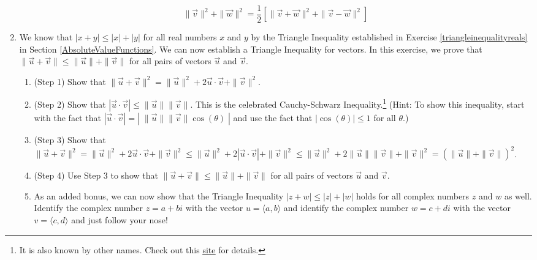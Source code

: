 \begin{enumerate}
\[ \|\vec{v}\|^2 + \|\vec{w}\|^2 = \dfrac{1}{2}\left[ \| \vec{v} + \vec{w}\|^2 + \|\vec{v} - \vec{w}\|^2\right] \]

\item We know that $|x + y| \leq |x| + |y|$ for all real numbers $x$ and $y$ by the Triangle Inequality established in Exercise \ref{triangleinequalityreals} in Section \ref{AbsoluteValueFunctions}.  We can now establish a Triangle Inequality for vectors.  In this exercise, we prove that $\| \vec{u} + \vec{v} \| \leq \| \vec{u} \| + \| \vec{v} \|$ for all pairs of vectors $\vec{u}$ and $\vec{v}$. 

\begin{enumerate}

\item (Step 1) Show that $\| \vec{u} + \vec{v} \|^{2} = \| \vec{u} \|^{2} + 2\vec{u} \cdot \vec{v} + \| \vec{v} \|^{2}$.

\item (Step 2) Show that $|\vec{u} \cdot \vec{v}| \leq \| \vec{u} \| \| \vec{v} \|$.  This is the celebrated Cauchy-Schwarz Inequality.\footnote{It is also known by other names.  Check out this \href{http://en.wikipedia.org/wiki/Cauchy-Schwarz_inequality}{\underline{site}} for details.}  (Hint: To show this inequality, start with the fact that $|\vec{u} \cdot \vec{v}| = |\; \| \vec{u} \| \| \vec{v} \|\cos(\theta) \;|$ and use the fact that $|\cos(\theta)| \leq 1$ for all $\theta$.)

\item (Step 3) Show that $\| \vec{u} + \vec{v} \|^{2} = \| \vec{u} \|^{2} + 2\vec{u} \cdot \vec{v} + \| \vec{v} \|^{2} \leq \| \vec{u} \|^{2} + 2|\vec{u} \cdot \vec{v}| + \| \vec{v} \|^{2} \leq \| \vec{u} \|^{2} + 2\| \vec{u} \| \| \vec{v} \| + \| \vec{v} \|^{2} = (\| \vec{u} \| + \| \vec{v} \|)^{2}$.

\item (Step 4) Use Step 3 to show that $\| \vec{u} + \vec{v} \| \leq \| \vec{u} \| + \| \vec{v} \|$ for all pairs of vectors $\vec{u}$ and $\vec{v}$.

\item As an added bonus, we can now show that the Triangle Inequality $|z + w| \leq |z| + |w|$ holds for all complex numbers $z$ and $w$ as well.  Identify the complex number $z = a + bi$ with the vector $u = \langle a, b \rangle$ and identify the complex number $w = c + di$ with the vector $v = \langle c, d \rangle$ and just follow your nose!

\end{enumerate}

\end{enumerate}

